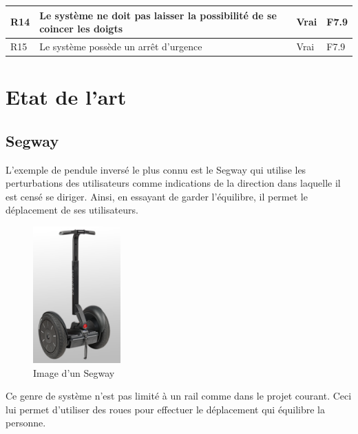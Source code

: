 \begin{table}[H]
{\begin{tabular}{|l|l|l|l|}
      R14                                                                                                                     & Le système ne doit pas laisser la possibilité de se coincer les doigts  & Vrai                     & F7.9              \\ \hline
      R15                                                                                                                     & Le système possède un arrêt d'urgence                                   & Vrai                     & F7.9              \\ \hline
    \end{tabular}%
  }
\end{table}

\section{Etat de l'art}\label{sec:EtatArt}

\subsection{Segway}

L'exemple de pendule inversé le plus connu est le Segway \cite{Segway} qui utilise les perturbations des utilisateurs comme indications de la direction dans laquelle il est censé se diriger. Ainsi, en essayant de garder l'équilibre, il permet le déplacement de ses utilisateurs.

\begin{figure}[H]
  \centering
  \includegraphics[width = 0.3\textwidth]{assets/figures/Segway.png}
  \caption{Image d'un Segway \cite{Segway}}
  \label{fig:Segway}
\end{figure}

Ce genre de système n'est pas limité à un rail comme dans le projet courant. Ceci lui permet d'utiliser des roues pour effectuer le déplacement qui équilibre la personne.

